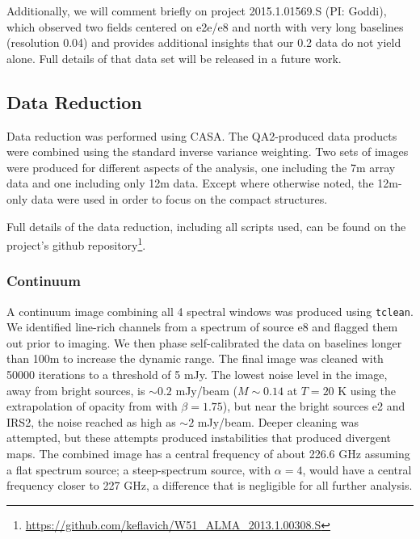 \documentclass{aa}
\begin{document}

Additionally, we will comment briefly on project 2015.1.01569.S (PI: Goddi),
which observed two fields centered on e2e/e8 and north with very long baselines
(resolution 0.04\arcsec) and provides additional insights that our 0.2\arcsec
data do not yield alone.  Full details of that data set will be released in a
future work.



\subsection{Data Reduction}
Data reduction was performed using CASA.  The QA2-produced data products were
combined using the standard inverse variance weighting.  Two sets of images
were produced for different aspects of the analysis, one including the 7m array
data and one including only 12m data.  Except where otherwise noted, the
12m-only data were used in order to focus on the compact structures.

Full details of the data reduction, including all scripts used, can be found
on the project's github repository\footnote{\url{https://github.com/keflavich/W51_ALMA_2013.1.00308.S}}.


\subsubsection{Continuum}
A continuum image combining all 4 spectral windows was produced using
\texttt{tclean}.  We identified line-rich channels from a spectrum of source e8
and flagged them out prior to imaging.  We then phase self-calibrated the data
on baselines longer than 100m to increase the dynamic range.  The final image
was cleaned with 50000 iterations to a threshold of 5 mJy.  The lowest noise
level in the image, away from bright sources, is $\sim0.2$ mJy/beam
($M\sim0.14$ \msun at $T=20$ K using the extrapolation of
\citet{Ossenkopf1994a} opacity from \citet{Aguirre2011a} with $\beta=1.75$),
but near the bright sources e2 and IRS2, the noise reached as high as $\sim2$
mJy/beam.  Deeper cleaning was attempted, but these attempts produced
instabilities that produced divergent maps.  The combined image has a central
frequency of about 226.6 GHz assuming a flat spectrum source; a steep-spectrum
source, with $\alpha=4$, would have a central frequency closer to 227 GHz, a
difference that is negligible for all further analysis.
\end{document}
